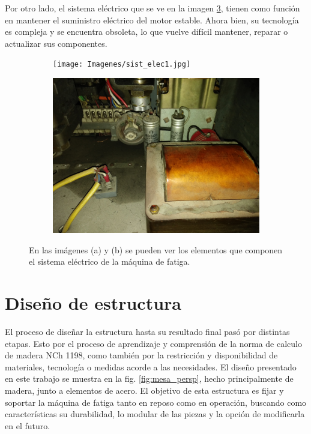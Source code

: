 Por otro lado, el sistema eléctrico que se ve en la imagen \ref{fig:sist_elec}, tienen como función en mantener el suministro eléctrico del motor estable. Ahora bien, su tecnología es compleja y se encuentra obsoleta, lo que vuelve difícil mantener, reparar o actualizar sus componentes.

\begin{figure}[h]
\centering
	\begin{subfigure}{0.5\linewidth}
		\centering
		\texttt{[image: Imagenes/sist\_elec1.jpg]}
		\caption{}\label{fig:sist_elect1}
	\end{subfigure}%
	\begin{subfigure}{0.5\linewidth}
		\centering
		\includegraphics[width=0.98\linewidth]{Imagenes/sist_elec2.jpg}
		\caption{}\label{fig:sist_elect2}
	\end{subfigure}%
\caption{En las imágenes (a) y (b) se pueden ver los elementos que componen el sistema eléctrico de la máquina de fatiga.}
\label{fig:sist_elec}
\end{figure}
 
\section{Diseño de estructura}
El proceso de diseñar la estructura hasta su resultado final pasó por distintas etapas. Esto por el proceso de aprendizaje y comprensión de la norma de calculo de madera NCh 1198, como también por la restricción y disponibilidad de materiales, tecnología o medidas acorde a las necesidades. El diseño presentado en este trabajo se muestra en la fig. \ref{fig:mesa_persp}, hecho principalmente de madera, junto a elementos de acero. El objetivo de esta estructura es fijar y soportar la máquina de fatiga tanto en reposo como en operación, buscando como características su durabilidad, lo modular de las piezas y la opción de modificarla en el futuro.

